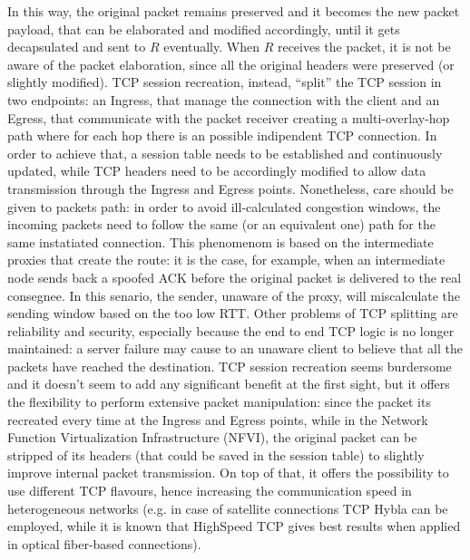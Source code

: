 \documentclass[10pt]{book}
\begin{document}
In this way, the original packet remains preserved and it becomes the new packet
payload, that can be elaborated and modified
accordingly, until it gets decapsulated and sent to $R$ eventually. When $R$
receives the packet, it is not be aware of the packet elaboration, since all the
original headers were preserved (or slightly modified). TCP session recreation,
instead, ``split'' the TCP session in two endpoints: an Ingress, that manage the
connection with the client and an Egress, that communicate with the packet
receiver creating a multi-overlay-hop path where for each hop there is an
possible indipendent TCP connection. In order to achieve that, a session table
needs to be established and continuously updated, while TCP headers need to be
accordingly modified to allow data transmission through the Ingress and Egress
points. Nonetheless, care should be given to packets path: in order to avoid
ill-calculated congestion windows, the incoming packets need to follow the same
(or an equivalent one) path for the same instatiated connection. This phenomenom
is based on the intermediate proxies that create the route: it is the case, for
example, when an intermediate node sends back a spoofed ACK before the original
packet is delivered to the real consegnee. In this senario, the sender, unaware
of the proxy, will miscalculate the sending window based on the too low RTT.
Other problems of TCP splitting are reliability and security, especially because
the end to end TCP logic is no longer maintained: a server failure may cause to
an unaware client to believe that all the packets have reached the destination.
TCP session recreation seems burdersome and it doesn't seem to add any
significant benefit at the first sight, but it offers the flexibility to perform
extensive packet manipulation: since the packet its recreated every time at the
Ingress and Egress points, while in the Network Function Virtualization
Infrastructure (NFVI), the original packet can be stripped of its headers (that
could be saved in the session table) to slightly improve internal packet
transmission.  On top of that, it
offers the possibility to use different TCP flavours, hence increasing the
communication speed in heterogeneous networks (e.g. in case of satellite
connections TCP Hybla can be employed, while it is known that HighSpeed TCP
gives best results when applied in optical fiber-based connections).
\end{document}
